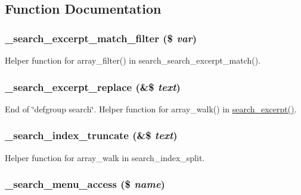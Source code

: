\subsection{Function Documentation}
\hypertarget{search_8module_abc952f2f6920f7647e15e1bde8330414}{
\subsubsection[{\_\-search\_\-excerpt\_\-match\_\-filter}]{\setlength{\rightskip}{0pt plus 5cm}\_\-search\_\-excerpt\_\-match\_\-filter (\$ {\em var})}}
\label{search_8module_abc952f2f6920f7647e15e1bde8330414}
Helper function for array\_\-filter() in search\_\-search\_\-excerpt\_\-match(). \hypertarget{search_8module_a7aff627bdbf0ad6208ded5e75e53f67f}{
\subsubsection[{\_\-search\_\-excerpt\_\-replace}]{\setlength{\rightskip}{0pt plus 5cm}\_\-search\_\-excerpt\_\-replace (\&\$ {\em text})}}
\label{search_8module_a7aff627bdbf0ad6208ded5e75e53f67f}
End of \char`\"{}defgroup search\char`\"{}. Helper function for array\_\-walk() in \hyperlink{group__search_gaa77622185b2d7ea771cf590d76ab3ba4}{search\_\-excerpt()}. \hypertarget{search_8module_a8cad6e5cadb04b33e53bd4872b8f37b4}{
\subsubsection[{\_\-search\_\-index\_\-truncate}]{\setlength{\rightskip}{0pt plus 5cm}\_\-search\_\-index\_\-truncate (\&\$ {\em text})}}
\label{search_8module_a8cad6e5cadb04b33e53bd4872b8f37b4}
Helper function for array\_\-walk in search\_\-index\_\-split. \hypertarget{search_8module_ad23d575da2f572416a56555fe51fc565}{
\subsubsection[{\_\-search\_\-menu\_\-access}]{\setlength{\rightskip}{0pt plus 5cm}\_\-search\_\-menu\_\-access (\$ {\em name})}}
